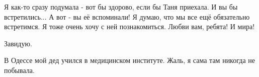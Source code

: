 \begin{itemize}
\begin{itemize}
\end{itemize}


Я как-то сразу подумала - вот бы здорово, если бы Таня приехала. И вы бы
встретились... А вот - вы её вспоминали! Я думаю, что мы все ещё обязательно
встретимся. Я тоже очень хочу с ней познакомиться. Любви вам, ребята! И мира!

Завидую.

В Одессе мой дед учился в медицинском институте. Жаль, я сама там никогда не побывала.

\end{itemize}
